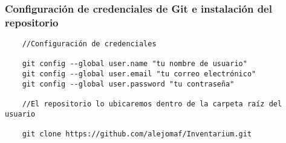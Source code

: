 \subsubsection{Configuración de credenciales de Git e instalación del repositorio}
\begin{verbatim}
    //Configuración de credenciales

    git config --global user.name "tu nombre de usuario"
    git config --global user.email "tu correo electrónico"
    git config --global user.password "tu contraseña"

    //El repositorio lo ubicaremos dentro de la carpeta raíz del usuario
    
    git clone https://github.com/alejomaf/Inventarium.git
\end{verbatim}